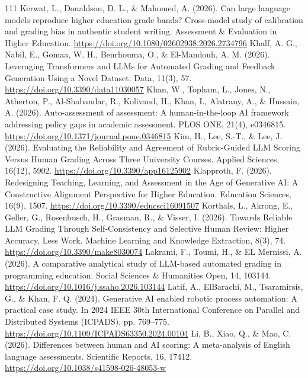 \begin{thebibliography}{111}
 Kerwat, L., Donaldson, D. L., \& Mahomed, A. (2026). Can large language models reproduce higher education grade bands? Cross-model study of calibration and grading bias in authentic student writing. Assessment \& Evaluation in Higher Education. \url{https://doi.org/10.1080/02602938.2026.2734796}
 Khalf, A. G., Nabil, E., Gomaa, W. H., Benrhouma, O., \& El-Mandouh, A. M. (2026). Leveraging Transformers and LLMs for Automated Grading and Feedback Generation Using a Novel Dataset. Data, 11(3), 57. \url{https://doi.org/10.3390/data11030057}
 Khan, W., Topham, L., Jones, N., Atherton, P., Al-Shabandar, R., Kolivand, H., Khan, I., Alatrany, A., \& Hussain, A. (2026). Auto-assessment of assessment: A human-in-the-loop AI framework addressing policy gaps in academic assessment. PLOS ONE, 21(4), e0346815. \url{https://doi.org/10.1371/journal.pone.0346815}
 Kim, H., Lee, S.-T., \& Lee, J. (2026). Evaluating the Reliability and Agreement of Rubric-Guided LLM Scoring Versus Human Grading Across Three University Courses. Applied Sciences, 16(12), 5902. \url{https://doi.org/10.3390/app16125902}
 Klapproth, F. (2026). Redesigning Teaching, Learning, and Assessment in the Age of Generative AI: A Constructive Alignment Perspective for Higher Education. Education Sciences, 16(9), 1507. \url{https://doi.org/10.3390/educsci16091507}
 Korthals, L., Akrong, E., Geller, G., Rosenbusch, H., Grasman, R., \& Visser, I. (2026). Towards Reliable LLM Grading Through Self-Consistency and Selective Human Review: Higher Accuracy, Less Work. Machine Learning and Knowledge Extraction, 8(3), 74. \url{https://doi.org/10.3390/make8030074}
 Lakrami, F., Toumi, H., \& EL Mernissi, A. (2026). A comparative analytical study of LLM-based automated grading in programming education. Social Sciences \& Humanities Open, 14, 103144. \url{https://doi.org/10.1016/j.ssaho.2026.103144}
 Latif, A., ElBarachi, M., Tsaramirsis, G., \& Khan, F. Q. (2024). Generative AI enabled robotic process automation: A practical case study. In 2024 IEEE 30th International Conference on Parallel and Distributed Systems (ICPADS), pp. 769--775. \url{https://doi.org/10.1109/ICPADS63350.2024.00104}
 Li, B., Xiao, Q., \& Mao, C. (2026). Differences between human and AI scoring: A meta-analysis of English language assessments. Scientific Reports, 16, 17412. \url{https://doi.org/10.1038/s41598-026-48053-w}

\end{thebibliography}
